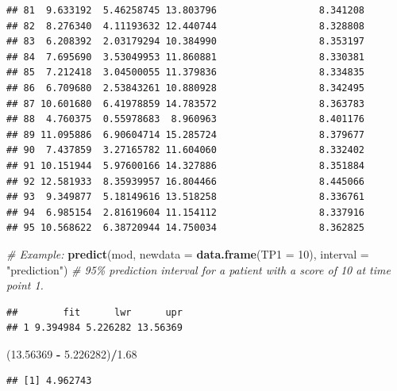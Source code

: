 \documentclass[
]{book}
\newenvironment{Shaded}{\begin{snugshade}}{\end{snugshade}}
\newcommand{\AttributeTok}[1]{\textcolor[rgb]{0.13,0.29,0.53}{#1}}
\newcommand{\CommentTok}[1]{\textcolor[rgb]{0.56,0.35,0.01}{\textit{#1}}}
\newcommand{\DecValTok}[1]{\textcolor[rgb]{0.00,0.00,0.81}{#1}}
\newcommand{\FloatTok}[1]{\textcolor[rgb]{0.00,0.00,0.81}{#1}}
\newcommand{\FunctionTok}[1]{\textcolor[rgb]{0.13,0.29,0.53}{\textbf{#1}}}
\newcommand{\NormalTok}[1]{#1}
\newcommand{\OtherTok}[1]{\textcolor[rgb]{0.56,0.35,0.01}{#1}}
\newcommand{\SpecialCharTok}[1]{\textcolor[rgb]{0.81,0.36,0.00}{\textbf{#1}}}
\newcommand{\StringTok}[1]{\textcolor[rgb]{0.31,0.60,0.02}{#1}}
\begin{document}
\begin{verbatim}
## 81  9.633192  5.46258745 13.803796                  8.341208
## 82  8.276340  4.11193632 12.440744                  8.328808
## 83  6.208392  2.03179294 10.384990                  8.353197
## 84  7.695690  3.53049953 11.860881                  8.330381
## 85  7.212418  3.04500055 11.379836                  8.334835
## 86  6.709680  2.53843261 10.880928                  8.342495
## 87 10.601680  6.41978859 14.783572                  8.363783
## 88  4.760375  0.55978683  8.960963                  8.401176
## 89 11.095886  6.90604714 15.285724                  8.379677
## 90  7.437859  3.27165782 11.604060                  8.332402
## 91 10.151944  5.97600166 14.327886                  8.351884
## 92 12.581933  8.35939957 16.804466                  8.445066
## 93  9.349877  5.18149616 13.518258                  8.336761
## 94  6.985154  2.81619604 11.154112                  8.337916
## 95 10.568622  6.38720944 14.750034                  8.362825
\end{verbatim}

\begin{Shaded}
\begin{Highlighting}[]
\CommentTok{\# Example:}
\FunctionTok{predict}\NormalTok{(mod, }\AttributeTok{newdata =} \FunctionTok{data.frame}\NormalTok{(}\AttributeTok{TP1 =} \DecValTok{10}\NormalTok{), }\AttributeTok{interval =} \StringTok{"prediction"}\NormalTok{) }\CommentTok{\# 95\% prediction interval for a patient with a score of 10 at time point 1.}
\end{Highlighting}
\end{Shaded}

\begin{verbatim}
##        fit      lwr      upr
## 1 9.394984 5.226282 13.56369
\end{verbatim}

\begin{Shaded}
\begin{Highlighting}[]
\NormalTok{(}\FloatTok{13.56369} \SpecialCharTok{{-}} \FloatTok{5.226282}\NormalTok{)}\SpecialCharTok{/}\FloatTok{1.68}
\end{Highlighting}
\end{Shaded}

\begin{verbatim}
## [1] 4.962743
\end{verbatim}

\begin{Shaded}
\end{Shaded}
\end{document}
